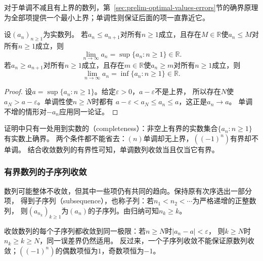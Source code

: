 对于单调不减且有上界的数列，第~\ref{sec:prelim-optimal-values-errors}节的确界原理
为全部项提供一个最小上界；单调性则保证后面的项一直靠近它。
\begin{theorem}[单调有界收敛定理]
\label{thm:analysis-monotone-bounded-sequence}
设$(a_n)_{n\geq1}$为实数列。
若$a_n\leq a_{n+1}$对所有$n\geq1$成立，且存在$M\in\mathbb R$使$a_n\leq M$对所有$n\geq1$成立，则
\[
 \lim_{n\to\infty}a_n=\sup\{a_n:n\geq1\}\in\mathbb R.
\]
若$a_n\geq a_{n+1}$对所有$n\geq1$成立，且存在$m\in\mathbb R$使$a_n\geq m$对所有$n\geq1$成立，则
\[
 \lim_{n\to\infty}a_n=\inf\{a_n:n\geq1\}\in\mathbb R.
\]
\end{theorem}
\begin{proof}
设$a=\sup\{a_n:n\geq1\}$。给定$\varepsilon>0$，$a-\varepsilon$不是上界，
所以存在$N$使$a_N>a-\varepsilon$。单调性使$n\geq N$时都有
$a-\varepsilon<a_N\leq a_n\leq a$，这正是$a_n\to a$。
单调不增的情形对$-a_n$应用同一论证。
\end{proof}
证明中只有一处用到实数的（completeness）：非空上有界的实数集合$\{a_n:n\geq1\}$有实数上确界。
两个条件都不能省去：$(n)$单调却无上界，$((-1)^n)$有界却不单调。
结合收敛数列的有界性可知，单调数列收敛当且仅当它有界。

\subsubsection{有界数列的子序列收敛}
数列可能整体不收敛，但其中一些项仍有共同的趋向。保持原有次序选出一部分项，
得到子序列（subsequence），也称子列：若$n_1<n_2<\cdots$为严格递增的正整数列，
则$(a_{n_k})_{k\geq1}$为$(a_n)$的子序列。由归纳可知$n_k\geq k$。

收敛数列的每个子序列都收敛到同一极限：若$n\geq N$时$|a_n-a|<\varepsilon$，
则$k\geq N$时$n_k\geq k\geq N$，同一误差界仍然适用。
反过来，一个子序列收敛不能保证原数列收敛；$((-1)^n)$的偶数项恒为$1$，奇数项恒为$-1$。

